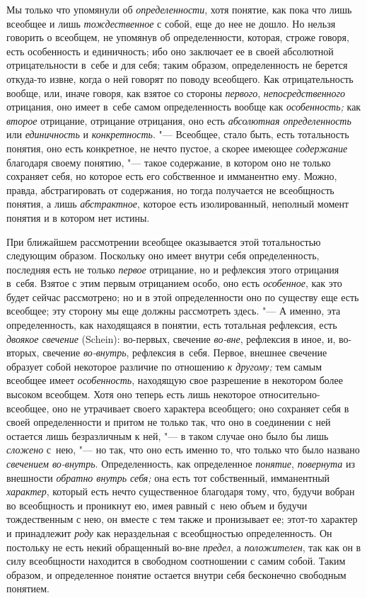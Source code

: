 Мы только что упомянули об {\em определенности}, хотя понятие, как пока что
лишь всеобщее и лишь {\em тождественное} с
собой, еще до нее не дошло. Но нельзя говорить о всеобщем, не упомянув об
определенности, которая, строже говоря, есть особенность и единичность; ибо
оно заключает ее в своей абсолютной отрицательности в~себе и для себя;
таким образом, определенность не берется откуда-то извне, когда о ней
говорят по поводу всеобщего. Как отрицательность вообще, или, иначе говоря,
как взятое со стороны {\em первого}, {\em непосредственного} отрицания, оно
имеет в~себе самом определенность вообще как {\em особенность;} как
{\em второе} отрицание, отрицание отрицания, оно есть {\em абсолютная
определенность} или {\em единичность} и {\em конкретность}. "--- Всеобщее,
стало быть, есть тотальность понятия, оно есть
конкретное, не нечто пустое, а скорее имеющее {\em содержание}
благодаря своему понятию, "--- такое содержание,
в котором оно не только сохраняет себя, но которое есть его собственное и
имманентно ему. Можно, правда, абстрагировать от содержания, но тогда
получается не всеобщность понятия, а лишь {\em абстрактное},
которое есть изолированный, неполный момент понятия и в котором нет истины.

При ближайшем рассмотрении всеобщее оказывается этой
тотальностью следующим образом. Поскольку оно имеет внутри себя
определенность, последняя есть не только {\em первое} отрицание,
но и рефлексия этого отрицания в~себя. Взятое с этим первым отрицанием
особо, оно есть {\em особенное},
как это будет сейчас рассмотрено; но и в этой определенности
оно по существу еще есть всеобщее; эту сторону мы еще должны рассмотреть
здесь. "--- \label{bkm:bm23a}А именно, эта определенность, как
находящаяся в понятии, есть тотальная рефлексия, есть {\em двоякое свечение}
(Schein): во-первых, свечение {\em во-вне}, рефлексия в иное, и, во-вторых,
свечение {\em во-внутрь}, рефлексия в~себя. Первое, внешнее свечение образует
собой некоторое различие по отношению {\em к другому;} тем самым всеобщее имеет
{\em особенность}, находящую свое разрешение в некотором более высоком
всеобщем. Хотя оно теперь есть лишь некоторое относительно-всеобщее, оно не
утрачивает своего характера всеобщего; оно сохраняет себя в своей
определенности и притом не только так, что оно в соединении с ней остается
лишь безразличным к ней, "--- в таком случае оно было бы лишь {\em сложено}
с~нею, "--- но так, что оно есть именно то, что только что было названо
{\em свечением во-внутрь}. Определенность, как определенное {\em понятие},
{\em повернута} из внешности {\em обратно внутрь себя;} она есть тот
собственный, имманентный {\em характер}, который есть нечто существенное
благодаря тому, что, будучи вобран во всеобщность и проникнут ею, имея равный
с~нею объем и будучи тождественным с нею, он вместе с тем также и пронизывает
ее; этот-то характер и принадлежит {\em роду} как нераздельная с всеобщностью
определенность. Он постольку не есть некий обращенный во-вне {\em предел},
а {\em положителен}, так как он в силу всеобщности находится в свободном
соотношении с самим собой. Таким образом, и определенное понятие остается
внутри себя бесконечно свободным понятием.

